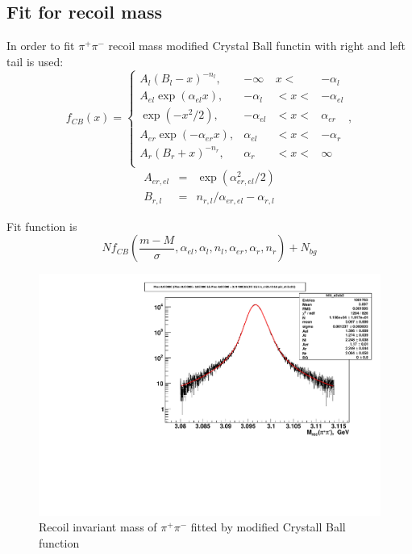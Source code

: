 \documentclass[a4paper,12pt]{article}
\begin{document}
\subsection{Fit for recoil mass}

In order to fit $\pi^+\pi^-$ recoil mass modified Crystal Ball \cite{CrystalBallFunc}functin with right and left tail is used:
\begin{equation}
	f_{CB}(x)  = 	\left\{
		\begin{array}{lrrr}
			A_l(B_l - x)^{-n_l},  & -\infty &   x <&   -\alpha_l \\
			A_{el}\exp(\alpha_{el}x), &  -\alpha_l & < x  < &-\alpha_{el} \\
			\exp( - x^2/2),  &  - \alpha_{el} & < x < & \alpha_{er} \\
			A_{er}\exp(-\alpha_{er}x), &  \alpha_{el} & < x < & -\alpha_{r} \\
			A_r(B_r + x)^{-n_r}, &   \alpha_r & < x < & \infty \\
		\end{array}
		\right., 
\end{equation}
\begin{equation}
	\begin{array}{lcl}
		A_{er, el} & = &  \exp(\alpha_{er, el}^2/2) \\
		B_{ r, l}  &  = & n_{r, l}/ \alpha_{er, el} - \alpha_{r, l}
	\end{array}
\end{equation}


Fit function is
\begin{equation}
N f_{CB}\left( \frac{m - M}{\sigma},  \alpha_{el},\alpha_{l}, n_l,  \alpha_{er}, \alpha_r,  n_r\right)  +  N_{bg}
\end{equation}








\begin{figure}
	\includegraphics[width=\textwidth]{fig/Mrec_fit_double_exp_double_crystal_ball.pdf}
	\caption{Recoil invariant mass of $\pi^+\pi^-$ fitted by 
		modified Crystall Ball function}
\end{figure}
\end{document}
